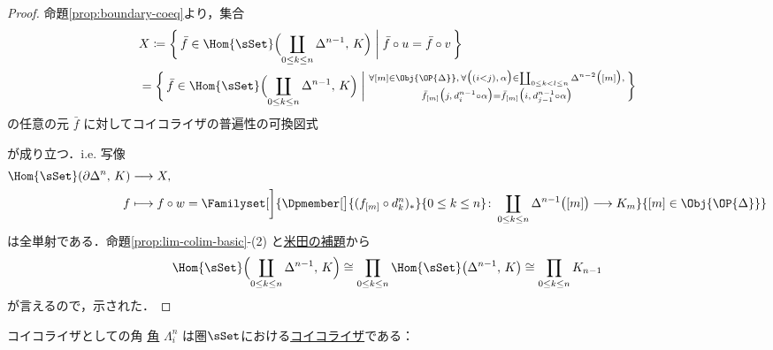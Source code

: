 \documentclass[TQFT_main]{subfiles}
\begin{document}
\begin{proof}
    命題\ref{prop:boundary-coeq}より，集合
    \begin{align}
        &X\coloneqq\biggl\{\, \bar{f} \in \Hom{\sSet}\Bigl(\coprod_{0 \le k \le n} \Delta^{n-1},\, K \Bigr) \biggm| \bar{f} \circ u = \bar{f} \circ v \,\biggr\}  \\
        &= \biggl\{\, \bar{f} \in \Hom{\sSet}\Bigl(\coprod_{0 \le k \le n} \Delta^{n-1},\, K \Bigr) \biggm| \substack{\forall [m] \in \Obj{\OP{\Delta}},\, \forall \bigl((i < j),\, \alpha\bigr) \in \coprod_{0 \le k < l \le n} \Delta^{n-2} \bigl( [m] \bigr),\\ \bar{f}_{[m]} \bigl( j,\, d^{n-1}_i \circ \alpha \bigr)  = \bar{f}_{[m]} \bigl( i,\, d^{n-1}_{j-1} \circ \alpha \bigr)}  \,\biggr\}
    \end{align}
    の任意の元 $\bar{f}$ に対してコイコライザの普遍性の可換図式
    \begin{center}
    \end{center}
    が成り立つ．i.e. 写像
    \begin{align}
        \Hom{\sSet} (\partial \Delta^n,\, K) &\lto X, \\
        f &\lmto f \circ w = \Familyset[\bigg]{\Dpmember[\big]{(f_{[m]} \circ d^n_k)_*}{0 \le k \le n} \colon \coprod_{0 \le k \le n} \Delta^{n-1} \bigl( [m] \bigr) \lto K_m}{[m] \in \Obj{\OP{\Delta}}}
    \end{align}
    は全単射である．命題\ref{prop:lim-colim-basic}-(2) と\hyperref[lem:Yoneda]{米田の補題}から
    \begin{align}
        \Hom{\sSet}\Bigl(\coprod_{0 \le k \le n} \Delta^{n-1},\, K \Bigr) \cong \prod_{0 \le k \le n} \Hom{\sSet} \bigl( \Delta^{n-1},\, K \bigr) \cong \prod_{0 \le k \le n} K_{n-1}
    \end{align}
    が言えるので，示された．
\end{proof}

\begin{myprop}[label=prop:horn-coeq]{コイコライザとしての角}
    \hyperref[def:horn]{角} $\Lambda^n_i$ は圏\hyperref[def:SimpSet]{$\sSet$}における\hyperref[def:eq-coeq]{コイコライザ}である：
    \begin{center}
    \end{center}
\end{myprop}
\end{document}
